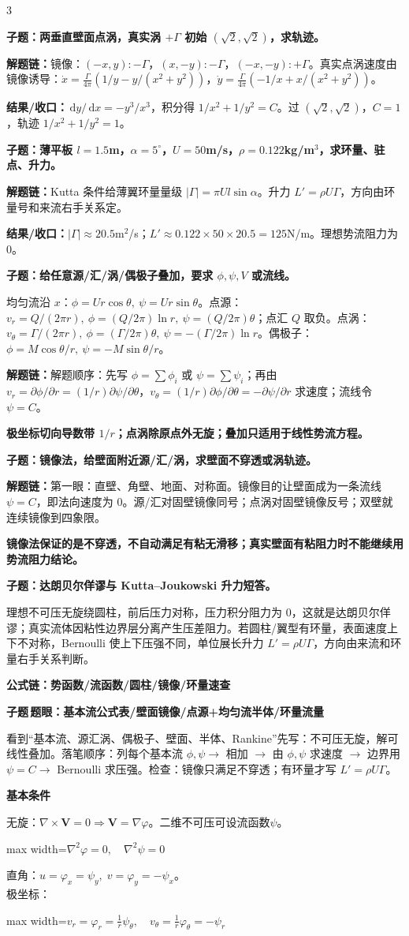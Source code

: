 \documentclass[a4paper]{article}
\newcommand{\qt}[1]{\vspace{0.25pt}\colorbox{Q}{\parbox{\dimexpr\linewidth-2\fboxsep}{\color{white}\bfseries #1}}\par}
\newcommand{\ans}[1]{\colorbox{G}{\parbox{\dimexpr\linewidth-2\fboxsep}{#1}}\par}
\newcommand{\warn}[1]{\colorbox{Y}{\parbox{\dimexpr\linewidth-2\fboxsep}{\color{E}\bfseries #1}}\par}
\newcommand{\chain}[1]{{\color{A}\bfseries 解题链：}#1\par}
\newcommand{\res}[1]{{\color{E}\bfseries 结果/收口：}#1\par}
\newcommand{\dd}{\,\mathrm d}
\newcommand{\sect}[1]{\qt{#1}}
\newcommand{\fml}[1]{\begin{adjustbox}{max width=\linewidth}$\displaystyle #1$\end{adjustbox}}
\newcommand{\labtag}[3]{{\bfseries\color{#1}\colorbox{#1}{\color{white}\fontsize{2.35}{2.48}\selectfont #2}\,#3}\par}
\newcommand{\subt}[1]{\labtag{Q}{子题}{#1}}
\newcommand{\schemepotential}{}
\newcommand{\subq}[1]{\subt{#1}}
\begin{document}
\begin{multicols}{3}
\qt{子题：两垂直壁面点涡，真实涡 $+\Gamma$ 初始 $(\sqrt2,\sqrt2)$，求轨迹。}
\chain{镜像：$(-x,y):-\Gamma$，$(x,-y):-\Gamma$，$(-x,-y):+\Gamma$。真实点涡速度由镜像诱导：$\dot x=\frac{\Gamma}{4\pi}(1/y-y/(x^2+y^2))$，$\dot y=\frac{\Gamma}{4\pi}(-1/x+x/(x^2+y^2))$。}
\res{$\dd y/\dd x=-y^3/x^3$，积分得 $1/x^2+1/y^2=C$。过 $(\sqrt2,\sqrt2)$，$C=1$，轨迹 $1/x^2+1/y^2=1$。}

\qt{子题：薄平板 $l=1.5$m，$\alpha=5^\circ$，$U=50$m/s，$\rho=0.122$kg/m$^3$，求环量、驻点、升力。}
\chain{Kutta 条件给薄翼环量量级 $|\Gamma|=\pi Ul\sin\alpha$。升力 $L'=\rho U\Gamma$，方向由环量号和来流右手关系定。}
\res{$|\Gamma|\approx20.5$m$^2$/s；$L'\approx0.122\times50\times20.5=125$N/m。理想势流阻力为 0。}

\qt{子题：给任意源/汇/涡/偶极子叠加，要求 $\phi,\psi,V$ 或流线。}
\ans{均匀流沿 $x$：$\phi=Ur\cos\theta,\ \psi=Ur\sin\theta$。点源：$v_r=Q/(2\pi r),\ \phi=(Q/2\pi)\ln r,\ \psi=(Q/2\pi)\theta$；点汇 $Q$ 取负。点涡：$v_\theta=\Gamma/(2\pi r),\ \phi=(\Gamma/2\pi)\theta,\ \psi=-(\Gamma/2\pi)\ln r$。偶极子：$\phi=M\cos\theta/r,\ \psi=-M\sin\theta/r$。}
\chain{解题顺序：先写 $\phi=\sum\phi_i$ 或 $\psi=\sum\psi_i$；再由 $v_r=\partial\phi/\partial r=(1/r)\partial\psi/\partial\theta$，$v_\theta=(1/r)\partial\phi/\partial\theta=-\partial\psi/\partial r$ 求速度；流线令 $\psi=C$。}
\warn{极坐标切向导数带 $1/r$；点涡除原点外无旋；叠加只适用于线性势流方程。}

\qt{子题：镜像法，给壁面附近源/汇/涡，求壁面不穿透或涡轨迹。}
\chain{第一眼：直壁、角壁、地面、对称面。镜像目的让壁面成为一条流线 $\psi=C$，即法向速度为 0。源/汇对固壁镜像同号；点涡对固壁镜像反号；双壁就连续镜像到四象限。}
\warn{镜像法保证的是不穿透，不自动满足有粘无滑移；真实壁面有粘阻力时不能继续用势流阻力结论。}

\qt{子题：达朗贝尔佯谬与 Kutta--Joukowski 升力短答。}
\ans{理想不可压无旋绕圆柱，前后压力对称，压力积分阻力为 0，这就是达朗贝尔佯谬；真实流体因粘性边界层分离产生压差阻力。若圆柱/翼型有环量，表面速度上下不对称，Bernoulli 使上下压强不同，单位展长升力 $L'=\rho U\Gamma$，方向由来流和环量右手关系判断。}


\qt{公式链：势函数/流函数/圆柱/镜像/环量速查}
{\fontsize{2.66}{2.82}\selectfont
\schemepotential
\subq{题眼：基本流公式表/壁面镜像/点源+均匀流半体/环量流量}
看到“基本流、源汇涡、偶极子、壁面、半体、Rankine”先写：不可压无旋，解可线性叠加。落笔顺序：列每个基本流 $\phi,\psi\to$ 相加 $\to$ 由 $\phi,\psi$ 求速度 $\to$ 边界用 $\psi=C\to$ Bernoulli 求压强。检查：镜像只满足不穿透；有环量才写 $L'=\rho U\Gamma$。
\sect{基本条件}
无旋：$\nabla\times\bm V=0\Rightarrow \bm V=\nabla\varphi$。二维不可压可设流函数$\psi$。\\
\fml{\nabla^2\varphi=0,\quad \nabla^2\psi=0}
直角：$u=\varphi_x=\psi_y,\;v=\varphi_y=-\psi_x$。\\
极坐标：\fml{v_r=\varphi_r=\frac1r\psi_\theta,\quad v_\theta=\frac1r\varphi_\theta=-\psi_r}

}
\end{multicols}
\end{document}

